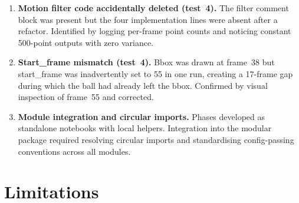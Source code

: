 \documentclass[12pt,a4paper]{article}
\begin{document}
\begin{enumerate}[leftmargin=1.8em]
  \item \textbf{Motion filter code accidentally deleted (test~4).} The filter comment block
    was present but the four implementation lines were absent after a refactor. Identified by
    logging per-frame point counts and noticing constant 500-point outputs with zero variance.

  \item \textbf{Start\_frame mismatch (test~4).} Bbox was drawn at frame~38 but start\_frame
    was inadvertently set to 55 in one run, creating a 17-frame gap during which the ball had
    already left the bbox. Confirmed by visual inspection of frame~55 and corrected.

  \item \textbf{Module integration and circular imports.} Phases developed as standalone
    notebooks with local helpers. Integration into the modular package required resolving
    circular imports and standardising config-passing conventions across all modules.
\end{enumerate}

\section{Limitations}
\end{document}

